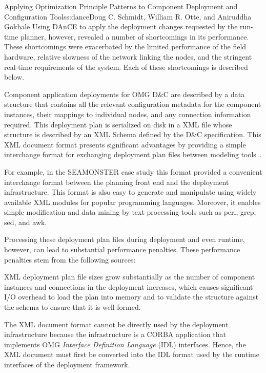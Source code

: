 \begin{aosachapter}{Applying Optimization Principle Patterns to Component Deployment and
                    Configuration Tools}{s:dance}{Doug C. Schmidt, William R. Otte, and Aniruddha Gokhale}
Using DAnCE to apply the deployment changes requested by the run-time
planner, however, revealed a number of shortcomings in its performance.
These shortcomings were exacerbated by the limited performance of the
field hardware, relative slowness of the network linking the nodes, and
the stringent real-time requirements of the system. Each of these
shortcomings is described below.


\label{sec.opp.parsing}


Component application deployments for OMG D\&C are described by a data
structure that contains all the relevant configuration metadata for the
component instances, their mappings to individual nodes, and any
connection information required. This deployment plan is serialized on
disk in a XML file whose structure is described by an XML Schema defined
by the D\&C specification. This XML document format presents significant
advantages by providing a simple interchange format for exchanging
deployment plan files between modeling tools~\cite{Schmidt:02ee}.

For example, in the SEAMONSTER case study this format provided a
convenient interchange format between the planning front end and the
deployment infrastructure. This format is also easy to generate and
manipulate using widely available XML modules for popular programming
languages. Moreover, it enables simple modification and data mining by
text processing tools such as perl, grep, sed, and awk.


\label{sec.challenge.parsing}

Processing these deployment plan files during deployment and even
runtime, however, can lead to substantial performance penalties. These
performance penalties stem from the following sources:

\begin{aosaitemize}
\item
  XML deployment plan file sizes grow substantially as the number of
  component instances and connections in the deployment increases, which
  causes significant I/O overhead to load the plan into memory and to
  validate the structure against the schema to ensure that it is
  well-formed.
\item
  The XML document format cannot be directly used by the deployment
  infrastructure because the infrastructure is a CORBA application that
  implements OMG \emph{Interface Definition Language} (IDL) interfaces.
  Hence, the XML document must first be converted into the IDL format
  used by the runtime interfaces of the deployment framework.
\end{aosaitemize}


\end{aosachapter}
